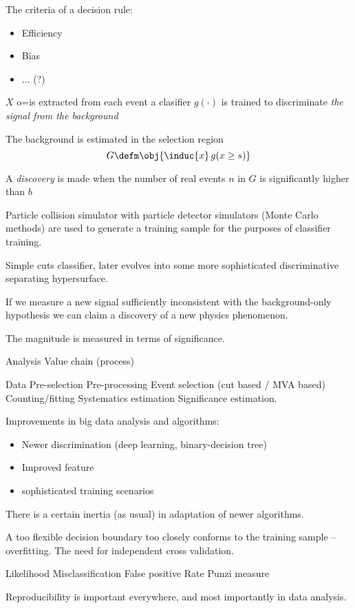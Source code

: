 The criteria of a decision rule:
\begin{itemize}
	\item Efficiency
	\item Bias
	\item ... (?)
\end{itemize}

$X$ o=is extracted from each event
a clasifier $g(\cdot)$ is trained to discriminate \emph{the signal from the background}

The background is estimated in the selection region
\[G \defm \obj{\induc{x}\, g(x\geq s)}\]

A \emph{discovery} is made when the number of real events $n$ in $G$ is significantly higher than $b$

Particle collision simulator with particle detector simulators (Monte Carlo methods) are used to generate a training sample for the purposes of classifier training.


Simple cuts classifier, later evolves into some more sophisticated discriminative separating hypersurface.

If we measure a new signal sufficiently inconsistent with the background-only hypothesis we can claim a discovery of a new physics phenomenon.

The magnitude is measured in terms of significance.

Analysis Value chain (process)

Data \to Pre-selection \to Pre-processing \to Event selection (cut based / MVA based) \to Counting/fitting \to Systematics estimation \to Significance estimation.

Improvements in big data analysis and algorithms:
\begin{itemize}
	\item Newer discrimination (deep learning, binary-decision tree)
	\item Improved feature
	\item sophisticated training scenarios
\end{itemize}
There is a certain inertia (as usual) in adaptation of newer algorithms.

A too flexible decision boundary too closely conforms to the training sample -- overfitting.
The need for independent cross validation.

Likelihood
Misclassification
False positive Rate
Punzi measure

Reproducibility is important everywhere, and most importantly in data analysis.

